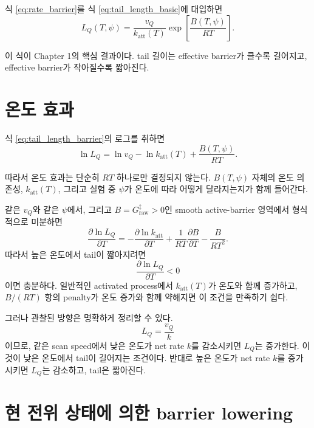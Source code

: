 \documentclass[11pt]{article}
\newcommand{\raw}{\mathrm{raw}}
\newcommand{\att}{\mathrm{att}}
\begin{document}
식 \eqref{eq:rate_barrier}를 식 \eqref{eq:tail_length_basic}에 대입하면
\begin{equation}
\boxed{
L_Q(T,\psi)
=
\frac{v_Q}{k_{\att}(T)}
\exp\!\left[\frac{B(T,\psi)}{RT}\right].
}
\label{eq:tail_length_barrier}
\end{equation}

이 식이 Chapter 1의 핵심 결과이다. tail 길이는 effective barrier가 클수록 길어지고, effective barrier가 작아질수록 짧아진다.

\section{온도 효과}

식 \eqref{eq:tail_length_barrier}의 로그를 취하면
\begin{equation}
\ln L_Q
=
\ln v_Q
-
\ln k_{\att}(T)
+
\frac{B(T,\psi)}{RT}.
\label{eq:log_tail}
\end{equation}

따라서 온도 효과는 단순히 \(RT\) 하나로만 결정되지 않는다. \(B(T,\psi)\) 자체의 온도 의존성, \(k_{\att}(T)\), 그리고 실험 중 \(\psi\)가 온도에 따라 어떻게 달라지는지가 함께 들어간다.

같은 \(v_Q\)와 같은 \(\psi\)에서, 그리고 \(B=G_{\raw}^\ddagger>0\)인 smooth active-barrier 영역에서 형식적으로 미분하면
\begin{equation}
\frac{\partial\ln L_Q}{\partial T}
=
-
\frac{\partial\ln k_{\att}}{\partial T}
+
\frac{1}{RT}\frac{\partial B}{\partial T}
-
\frac{B}{RT^2}.
\label{eq:temperature_tail_derivative}
\end{equation}
따라서 높은 온도에서 tail이 짧아지려면
\begin{equation}
\frac{\partial\ln L_Q}{\partial T}<0
\end{equation}
이면 충분하다. 일반적인 activated process에서 \(k_{\att}(T)\)가 온도와 함께 증가하고, \(B/(RT)\) 항의 penalty가 온도 증가와 함께 약해지면 이 조건을 만족하기 쉽다.

그러나 관찰된 방향은 명확하게 정리할 수 있다.
\begin{equation}
L_Q=\frac{v_Q}{k}
\end{equation}
이므로, 같은 scan speed에서 낮은 온도가 net rate \(k\)를 감소시키면 \(L_Q\)는 증가한다. 이것이 낮은 온도에서 tail이 길어지는 조건이다. 반대로 높은 온도가 net rate \(k\)를 증가시키면 \(L_Q\)는 감소하고, tail은 짧아진다.

\section{현 전위 상태에 의한 barrier lowering}
\end{document}
